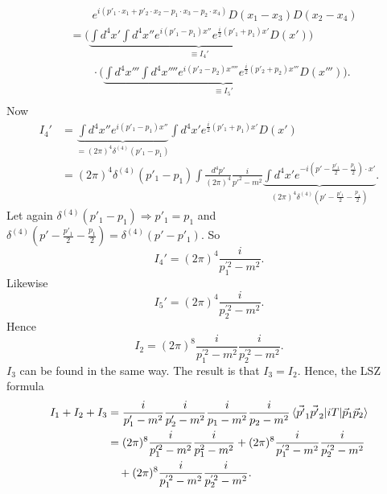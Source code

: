 \begin{example}
\begin{enumerate}
\begin{equation}
\begin{split}
				&\qquad e^{i(p'_1\cdot x_1+p'_2\cdot x_2-p_1\cdot x_3-p_2\cdot x_4)}D(x_1-x_3)D(x_2-x_4)\\
				&=\bigg(\underbrace{\int d^4x' \int d^4x''e^{i(p'_1-p_1)x''}e^{\frac{i}{2}(p'_1+p_1)x'}D(x')}_{\equiv I_4'}\bigg)\\
				&\qquad\cdot\bigg(\underbrace{\int d^4x''' \int d^4x''''e^{i(p'_2-p_2)x''''}e^{\frac{i}{2}(p'_2+p_2)x'''}D(x''')}_{\equiv I_5'}\bigg).\\
			\end{split}
		\end{equation} 
		Now
		\begin{equation}
			\begin{split}
				I_4'&=\underbrace{\int d^4x''e^{i(p'_1-p_1)x''}}_{=(2\pi)^4\delta^{(4)}(p'_1-p_1)}\int d^4x'e^{\frac{i}{2}(p'_1+p_1)x'}D(x')\\
				&=(2\pi)^4\delta^{(4)}(p'_1-p_1)\int\frac{d^4p'}{(2\pi)^4}\frac{i}{p'^2-m^2}\underbrace{\int d^4x'e^{-i(p'-\frac{p'_1}{2}-\frac{p_1}{2})\cdot x'}}_{(2\pi)^4\delta^{(4)}(p'-\frac{p'_1}{2}-\frac{p_1}{2})}.
			\end{split}
		\end{equation} 
		Let again $\delta^{(4)}(p'_1-p_1)\Rightarrow p'_1=p_1$ and $\delta^{(4)}(p'-\frac{p'_1}{2}-\frac{p_1}{2})=\delta^{(4)}(p'-p'_1)$. So
		\begin{equation}
			I_4'=(2\pi)^4\frac{i}{p_1^{'2}-m^2}.
		\end{equation} 
		Likewise
		\begin{equation}
			I_5'=(2\pi)^4\frac{i}{p_2^{'2}-m^2}.
		\end{equation} 
		Hence
		\begin{equation}
			I_2=(2\pi)^8\frac{i}{p_1^{'2}-m^2}\frac{i}{p_2^{'2}-m^2}.
		\end{equation} 
		$I_3$ can be found in the same way. The result is that $I_3=I_2$. Hence, the LSZ formula
		\begin{equation}
			\begin{split}
				I_1+I_2+I_3&=\frac{i}{p'_1-m^2}\frac{i}{p'_2-m^2}\frac{i}{p_1-m^2}\frac{i}{p_2-m^2}\braket{\vec{p'}_1\vec{p'}_2|iT|\vec{p}_1\vec{p}_2}\\
				&=(2\pi)^8\frac{i}{p_1'^2-m^2}\frac{i}{p_1^2-m^2}+(2\pi)^8\frac{i}{p_1^{'2}-m^2}\frac{i}{p_2^{'2}-m^2}\\
				&\quad+(2\pi)^8\frac{i}{p_1^{'2}-m^2}\frac{i}{p_2^{'2}-m^2}.\\
			\end{split}
		\end{equation}  

\end{enumerate}
\end{example}
